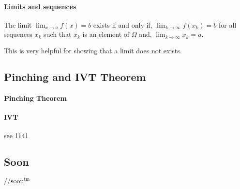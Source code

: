 \documentclass[12pt, letterpaper]{article}
\begin{document}
    \paragraph{Limits and sequences}
    The limit \(\lim_{x\to a} f(x) = b\) exists if and only if,
    \(\lim_{k\to\infty} f(x_k) = b\)  for all sequences \({x_k}\) such that 
    \(x_k\) is an element of \(\Omega\) and,
    \(\lim_{k\to\infty} x_k = a\).
    
    This is very helpful for showing that a limit does not exists.

    \subsection{Pinching and IVT Theorem}
    \paragraph{Pinching Theorem}
    \paragraph{IVT}
    see 1141
    
    
    \subsection{Soon}
    \(//\text{soon}^\text{tm}\)
\end{document}
